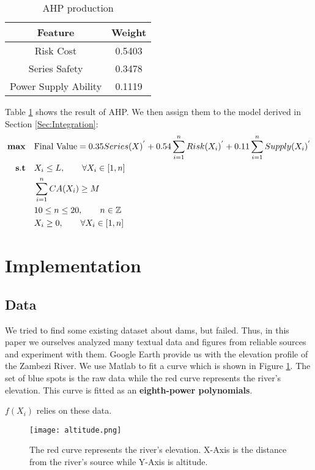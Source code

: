 \documentclass{mcmthesis}
\begin{document}
\begin{table}[h]
    \centering
    \caption{AHP production}
    \label{tab:AHP}
    \begin{tabular}{c c}
\hline
    	Feature & Weight\\
\hline
	Risk Cost & 0.5403\\
	Series Safety & 0.3478\\
	Power Supply Ability & 0.1119\\
\hline
    \end{tabular}
\end{table}

Table \ref{tab:AHP} shows the result of AHP. We then assign them to the model derived in Section \ref{Sec:Integration}:
\begin{equation*}
\begin{split}
 {\bf max}\quad &\text{Final Value}  = 0.35Series(X)^{'} + 0.54\sum_{i=1}^{n}{Risk(X_i)^{'}} + 0.11\sum_{i=1}^{n}{Supply(X_i)^{'}}\\
  {\bf s.t}\quad  &X_i \le L, \qquad \forall X_i \in [1,n]\\
	& \sum_{i=1}^{n}{CA(X_i)}\ge M\\
     	& 10\le n\le 20, \qquad n \in \mathbb{Z} \\
	& X_i \ge 0, \qquad \forall X_i \in [1,n]\\
\end{split}
\end{equation*}


\section{Implementation} \label{Sec-Implementation}
\subsection{Data}\label{Sec:Data}
We tried to find some existing dataset about dams, but failed. Thus, in this paper we ourselves analyzed many textual data and figures from reliable sources and experiment with them. Google Earth provide us with the elevation profile of the Zambezi River. We use Matlab to fit a curve which is shown in Figure \ref{fig:altitude}. The set of blue spots is the raw data while the red curve represents the river's elevation. This curve is fitted as an \textbf{eighth-power polynomials}.

$f(X_i)$ relies on these data.
\begin{figure}[h]
    \centering
    \texttt{[image: altitude.png]}
    \caption{The red curve represents the river's elevation. X-Axis is the distance from the river's source while Y-Axis is altitude.}
    \label{fig:altitude}
\end{figure}
\end{document}
